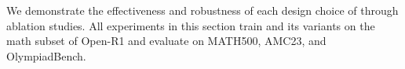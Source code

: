 We demonstrate the effectiveness and robustness of each design choice of \name through ablation studies.
All experiments in this section train \name and its variants on the math subset of Open-R1 and evaluate on MATH500, AMC23, and OlympiadBench.


